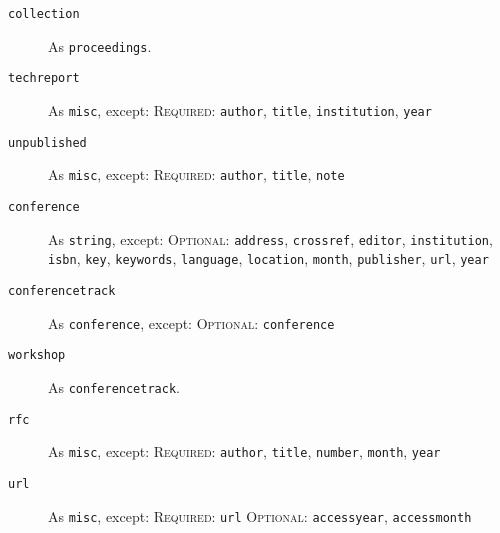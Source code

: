 \documentclass{article}
\begin{document}
\begin{description}
\item[\texttt{collection}] As \texttt{proceedings}.

\item[\texttt{techreport}] As \texttt{misc}, except:
\textsc{Required:} \texttt{author}, \texttt{title}, \texttt{institution},
\texttt{year}

\item[\texttt{unpublished}] As \texttt{misc}, except:
\textsc{Required:} \texttt{author}, \texttt{title}, \texttt{note}

\item[\texttt{conference}] As \texttt{string}, except:
\textsc{Optional:}
\texttt{address},
\texttt{crossref},
\texttt{editor},
\texttt{institution},
\texttt{isbn},
\texttt{key},
\texttt{keywords},
\texttt{language},
\texttt{location},
\texttt{month},
\texttt{publisher},
\texttt{url},
\texttt{year}

\item[\texttt{conferencetrack}] As \texttt{conference}, except:
\textsc{Optional:} \texttt{conference}

\item[\texttt{workshop}] As \texttt{conferencetrack}.

\item[\texttt{rfc}] As \texttt{misc}, except:
\textsc{Required:} \texttt{author}, \texttt{title}, \texttt{number},
\texttt{month}, \texttt{year}

\item[\texttt{url}] As \texttt{misc}, except:
\textsc{Required:} \texttt{url}
\textsc{Optional:} \texttt{accessyear}, \texttt{accessmonth}

\end{description}
\end{document}
